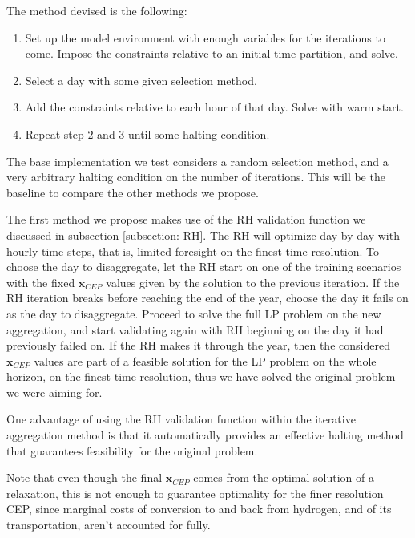 \documentclass[smallextended,natbib]{svjour3}       %
\numberwithin{theorem}{section}
\begin{document}
The method devised is the following:
\label{time-iter-alg}
\begin{enumerate}
\item Set up the model environment with enough variables for the iterations to come. Impose the constraints relative to an initial time partition, and solve.
\item Select a day with some given selection method.
\item Add the constraints relative to each hour of that day. Solve with warm start.
\item Repeat step 2 and 3 until some halting condition.
\end{enumerate}

The base implementation we test considers a random selection method, and a very arbitrary halting condition on the number of iterations. 
This will be the baseline to compare the other methods we propose.


The first method we propose makes use of the RH validation function we discussed in subsection \ref{subsection: RH}. 
The RH will optimize day-by-day with hourly time steps, that is, limited foresight on the finest time resolution. 
To choose the day to disaggregate, let the RH start on one of the training scenarios with the fixed $\mathbf{x}_{CEP}$ values given by the solution to the previous iteration. 
If the RH iteration breaks before reaching the end of the year, choose the day it fails on as the day to disaggregate. 
Proceed to solve the full LP problem on the new aggregation, and start validating again with RH beginning on the day it had previously failed on. 
If the RH makes it through the year, then the considered $\mathbf{x}_{CEP}$ values are part of a feasible solution for the LP problem on the whole horizon, on the finest time resolution, thus we have solved the original problem we were aiming for.

One advantage of using the RH validation function within the iterative aggregation method is that it automatically provides an effective halting method that guarantees feasibility for the original problem.

Note that even though the final $\mathbf{x}_{CEP}$ comes from the optimal solution of a relaxation, this is not enough to guarantee optimality for the finer resolution CEP, since marginal costs of conversion to and back from hydrogen, and of its transportation, aren't accounted for fully. 
\end{document}
